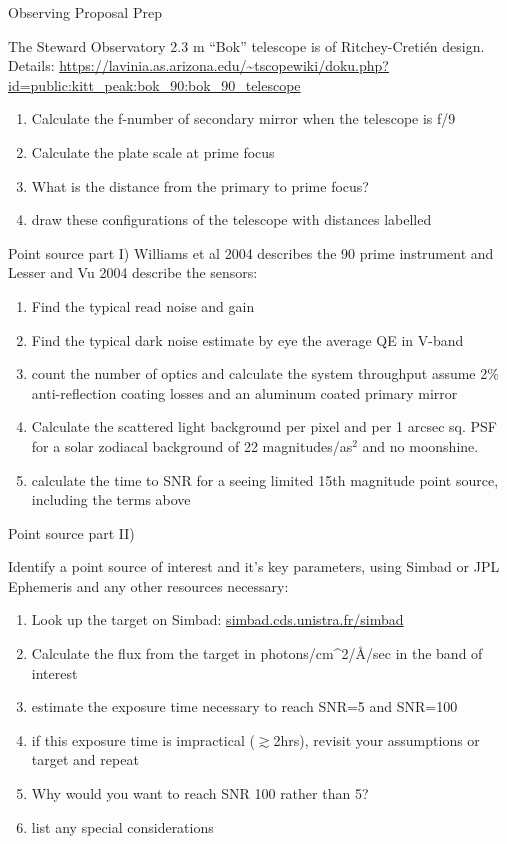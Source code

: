 \begin{frame}{Observing Proposal Prep}
    
The Steward Observatory 2.3 m ``Bok'' telescope is of Ritchey-Cretién design.%
 Details: \url{https://lavinia.as.arizona.edu/~tscopewiki/doku.php?id=public:kitt_peak:bok_90:bok_90_telescope}
 
 \begin{enumerate}
\item Calculate the f-number of secondary mirror when the telescope is f/9
\item Calculate the plate scale at prime focus
\item What is the distance from the primary to prime focus?
\item draw these configurations of the telescope with distances labelled
\end{enumerate}

\begin{frame}{Point source part I)}
Williams et al 2004 describes the 90 prime instrument and Lesser and Vu 2004 describe the sensors:
\begin{enumerate}
    \item Find the typical read noise and gain
    \item Find the typical dark noise
    \find estimate by eye the average QE in V-band
    \find 
    \item count the number of optics and calculate the system throughput assume 2\% anti-reflection coating losses and an aluminum coated primary mirror
    \item Calculate the scattered light background per pixel and per 1 arcsec sq. PSF for a solar zodiacal background of 22 magnitudes/as$^2$ and no moonshine. 
    \item calculate the time to SNR for a seeing limited 15th magnitude point source, including the terms above
\end{enumerate}
    
\end{frame}

\begin{frame}{Point source part II)}

Identify a point source of interest and it's key parameters, using Simbad or JPL Ephemeris and any other resources necessary:

 \begin{enumerate}
 \item Look up the target on Simbad: \url{simbad.cds.unistra.fr/simbad}
 \item Calculate the flux from the target in photons/cm^2/\AA /sec in the band of interest
 \item estimate the exposure time necessary to reach SNR=5 and SNR=100
 \item if this exposure time is impractical ($\gtrsim$2hrs), revisit your assumptions or target and repeat
 \item Why would you want to reach SNR 100 rather than 5?
 \item list any special considerations
\end{enumerate}
\end{frame}


\end{frame}
